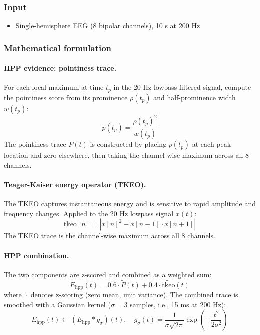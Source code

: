 \subsubsection{Input}

\begin{itemize}
  \item Single-hemisphere EEG (8 bipolar channels), 10 s at 200 Hz
\end{itemize}

\subsubsection{Mathematical formulation}

\paragraph{HPP evidence: pointiness trace.}
For each local maximum at time $t_p$ in the 20 Hz lowpass-filtered signal, compute the pointiness score from its prominence $\rho(t_p)$ and half-prominence width $w(t_p)$:
\[ p(t_p) = \frac{\rho(t_p)^2}{w(t_p)} \tag{1} \]
The pointiness trace $P(t)$ is constructed by placing $p(t_p)$ at each peak location and zero elsewhere, then taking the channel-wise maximum across all 8 channels.

\paragraph{Teager-Kaiser energy operator (TKEO).}
The TKEO captures instantaneous energy and is sensitive to rapid amplitude and frequency changes. Applied to the 20 Hz lowpass signal $x(t)$:
\[ \mathrm{tkeo}[n] = \left|x[n]^2 - x[n-1] \cdot x[n+1]\right| \tag{2} \]
The TKEO trace is the channel-wise maximum across all 8 channels.

\paragraph{HPP combination.}
The two components are z-scored and combined as a weighted sum:
\[ E_{\mathrm{hpp}}(t) = 0.6 \cdot \tilde{P}(t) + 0.4 \cdot \widetilde{\mathrm{tkeo}}(t) \tag{3} \]
where $\tilde{\cdot}$ denotes z-scoring (zero mean, unit variance). The combined trace is smoothed with a Gaussian kernel ($\sigma = 3$ samples, i.e., 15 ms at 200 Hz):
\[ E_{\mathrm{hpp}}(t) \leftarrow (E_{\mathrm{hpp}} * g_\sigma)(t), \quad g_\sigma(t) = \frac{1}{\sigma\sqrt{2\pi}}\exp\!\left(-\frac{t^2}{2\sigma^2}\right) \tag{4} \]

